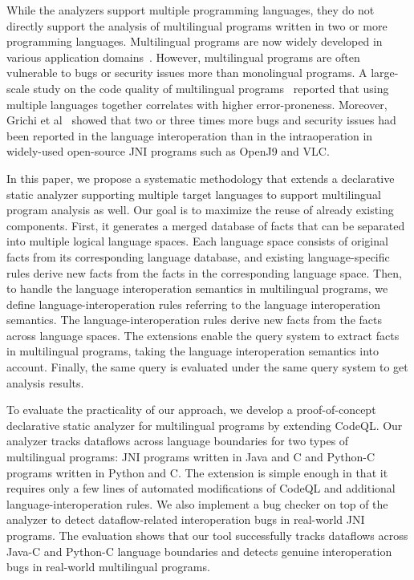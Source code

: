 While the analyzers support multiple programming languages, they do not directly
support the analysis of multilingual programs written in two or more
programming languages. Multilingual programs are now widely developed in
various application domains~\cite{kochhar2016large, mergendahlcross}. However,
multilingual programs are often vulnerable to bugs or security issues more than
monolingual programs. A large-scale study on the code quality of multilingual
programs~\cite{kochhar2016large} reported that using multiple languages
together correlates with higher error-proneness. Moreover,
Grichi et al~\cite{grichi2020impact} showed that two or three times more bugs and security
issues had been reported in the language interoperation than in the
intraoperation in widely-used open-source JNI programs such as OpenJ9 and VLC.

In this paper, we propose a systematic methodology that extends a
declarative static analyzer supporting multiple target languages to support
multilingual program analysis as well. Our goal is to maximize the reuse of
already existing components. First, it generates a merged database of facts that can
be separated into multiple logical language spaces.  Each language space
consists of original facts from its corresponding language database, and existing
language-specific rules derive new facts from the facts in the corresponding
language space. Then, to handle the language interoperation semantics in
multilingual programs, we define language-interoperation rules referring to
the language interoperation semantics. The language-interoperation rules derive new
facts from the facts across language spaces. The extensions enable the query system
to extract facts in multilingual programs, taking the language
interoperation semantics into account.
Finally, the same query is evaluated under the same query system to get
analysis results.

To evaluate the practicality of our approach, we develop a proof-of-concept
declarative static analyzer for multilingual programs by extending CodeQL. Our
analyzer tracks dataflows across language boundaries for two types of
multilingual programs: JNI programs written in Java and C and Python-C
programs written in Python and C. The extension is simple enough in that
it requires only a few lines of automated modifications of CodeQL and additional
language-interoperation rules. We also implement a bug checker on top of
the analyzer to detect dataflow-related interoperation bugs in real-world JNI programs.
The evaluation shows that our tool successfully tracks dataflows across
Java-C and Python-C language boundaries and detects genuine interoperation
bugs in real-world multilingual programs.


